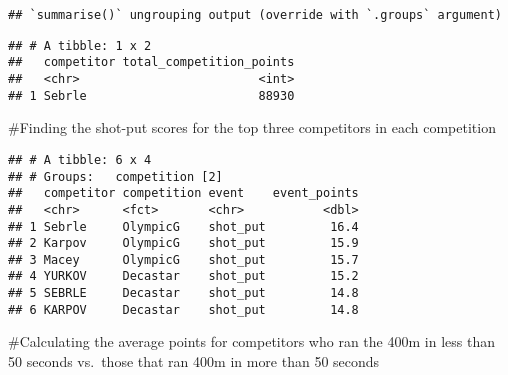 \documentclass[]{article}
\newenvironment{Shaded}{\begin{snugshade}}{\end{snugshade}}
\newcommand{\DataTypeTok}[1]{\textcolor[rgb]{0.13,0.29,0.53}{#1}}
\newcommand{\DecValTok}[1]{\textcolor[rgb]{0.00,0.00,0.81}{#1}}
\newcommand{\KeywordTok}[1]{\textcolor[rgb]{0.13,0.29,0.53}{\textbf{#1}}}
\newcommand{\NormalTok}[1]{#1}
\newcommand{\OperatorTok}[1]{\textcolor[rgb]{0.81,0.36,0.00}{\textbf{#1}}}
\newcommand{\StringTok}[1]{\textcolor[rgb]{0.31,0.60,0.02}{#1}}
\begin{document}
\begin{verbatim}
## `summarise()` ungrouping output (override with `.groups` argument)
\end{verbatim}

\begin{verbatim}
## # A tibble: 1 x 2
##   competitor total_competition_points
##   <chr>                         <int>
## 1 Sebrle                        88930
\end{verbatim}

 \#Finding the shot-put scores for the top three competitors in each
competition

\begin{Shaded}
\end{Shaded}

\begin{verbatim}
## # A tibble: 6 x 4
## # Groups:   competition [2]
##   competitor competition event    event_points
##   <chr>      <fct>       <chr>           <dbl>
## 1 Sebrle     OlympicG    shot_put         16.4
## 2 Karpov     OlympicG    shot_put         15.9
## 3 Macey      OlympicG    shot_put         15.7
## 4 YURKOV     Decastar    shot_put         15.2
## 5 SEBRLE     Decastar    shot_put         14.8
## 6 KARPOV     Decastar    shot_put         14.8
\end{verbatim}

 \#Calculating the average points for competitors who ran the 400m in
less than 50 seconds vs.~those that ran 400m in more than 50 seconds

\begin{Shaded}
\end{Shaded}
\end{document}
